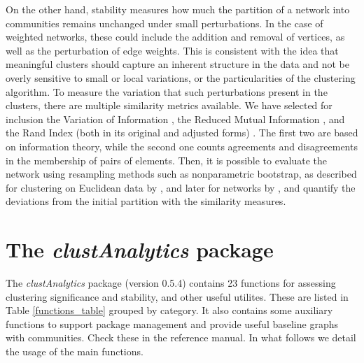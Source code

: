 On the other hand, stability measures how much the partition of a network into communities remains unchanged under small perturbations. In the case of weighted networks, these could include the addition and removal of vertices, as well as the perturbation of edge weights. This is consistent with the idea that meaningful clusters should capture an inherent structure in the data and not be overly sensitive to small or local variations, or the particularities of the clustering algorithm. To measure the variation that such perturbations present in the clusters, there are multiple similarity metrics available. We have selected for inclusion the Variation of Information \citep{varinformation}, the Reduced Mutual Information \citep{corrected_MI_Newman2020}, and the Rand Index (both in its original and adjusted forms) \citep{Hubert1985}. The first two are based on information theory, while the second one counts agreements and disagreements in the membership of pairs of elements. Then, it is possible to evaluate the network using resampling methods such as nonparametric bootstrap, as described for clustering on Euclidean data by \cite{Hennig2007}, and later for networks by \cite{arratia2021clustering}, and quantify the deviations from the initial partition with the similarity measures.



\section{The \textit{clustAnalytics} package} 

The  \textit{clustAnalytics} package (version 0.5.4) contains  23 functions for assessing  clustering significance and stability, and other useful utilites. These are listed in Table \ref{functions_table} grouped by category. It also contains some  auxiliary functions to support package management and provide useful baseline graphs with communities. Check these in the reference manual. In what follows we detail the usage of the main functions.


